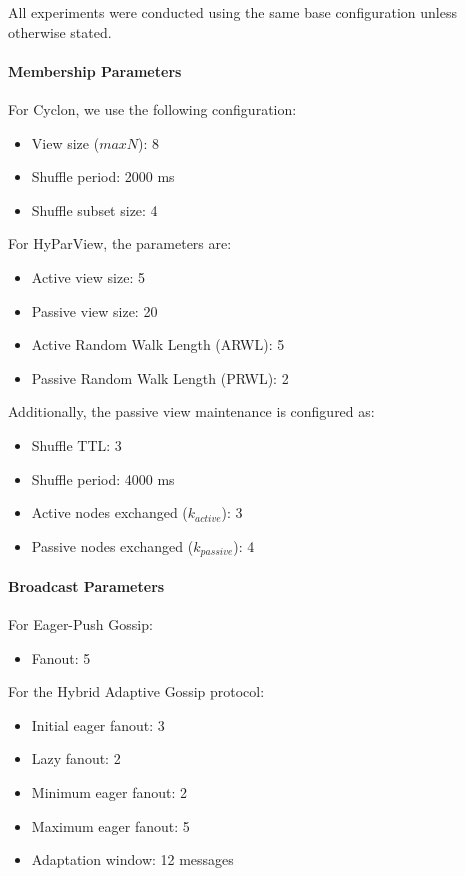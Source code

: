 \documentclass[sigconf,a4paper]{acmart}
\begin{document}
All experiments were conducted using the same base configuration unless
otherwise stated.

\paragraph{Membership Parameters}

For Cyclon, we use the following configuration:

\begin{itemize}
    \item View size ($maxN$): 8
    \item Shuffle period: 2000 ms
    \item Shuffle subset size: 4
\end{itemize}

For HyParView, the parameters are:

\begin{itemize}
    \item Active view size: 5
    \item Passive view size: 20
    \item Active Random Walk Length (ARWL): 5
    \item Passive Random Walk Length (PRWL): 2
\end{itemize}

Additionally, the passive view maintenance is configured as:

\begin{itemize}
    \item Shuffle TTL: 3
    \item Shuffle period: 4000 ms
    \item Active nodes exchanged ($k_{active}$): 3
    \item Passive nodes exchanged ($k_{passive}$): 4
\end{itemize}

\paragraph{Broadcast Parameters}

For Eager-Push Gossip:

\begin{itemize}
    \item Fanout: 5
\end{itemize}

For the Hybrid Adaptive Gossip protocol:

\begin{itemize}
    \item Initial eager fanout: 3
    \item Lazy fanout: 2
    \item Minimum eager fanout: 2
    \item Maximum eager fanout: 5
    \item Adaptation window: 12 messages
\end{itemize}
\end{document}

